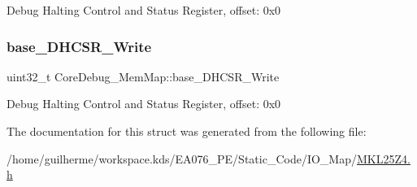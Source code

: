 Debug Halting Control and Status Register, offset\+: 0x0 \mbox{\label{struct_core_debug___mem_map_a57de52c8c1eb5789546543f2408ce487}} 
\subsubsection{\texorpdfstring{base\+\_\+\+D\+H\+C\+S\+R\+\_\+\+Write}{base\_DHCSR\_Write}}
{\footnotesize\ttfamily uint32\+\_\+t Core\+Debug\+\_\+\+Mem\+Map\+::base\+\_\+\+D\+H\+C\+S\+R\+\_\+\+Write}

Debug Halting Control and Status Register, offset\+: 0x0 

The documentation for this struct was generated from the following file\+:\begin{DoxyCompactItemize}
\item 
/home/guilherme/workspace.\+kds/\+E\+A076\+\_\+\+P\+E/\+Static\+\_\+\+Code/\+I\+O\+\_\+\+Map/\hyperlink{_m_k_l25_z4_8h}{M\+K\+L25\+Z4.\+h}\end{DoxyCompactItemize}
